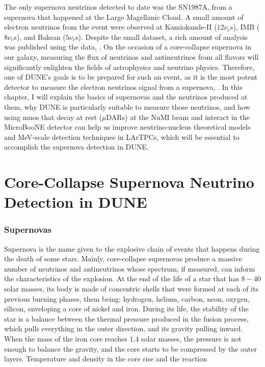 The only supernova neutrinos detected to date was the SN1987A, from a supernova that happened at the Large Magellanic Cloud. A small amount of electron neutrinos from the event were observed at Kamiokande-II ($12 \nu_e$s), IMB ($8 \nu_e$s), and Baksan ($5 \nu_e$s). Despite the small dataset, a rich amount of analysis was published using the data, \cite{Kamiokande-II-PRL, Kamiokande-II-PRD, IMB, Baksan}. 
 On the occasion of a core-collapse supernova in our galaxy, measuring the flux of neutrinos and antineutrinos from all flavors will significantly enlighten the fields of astrophysics and neutrino physics. Therefore, one of DUNE's goals is to be prepared for such an event, as it is the most potent detector to measure the electron neutrinos signal from a supernova, \cite{dune_SAND}.
 In this chapter, I will explain the basics of supernovas and the neutrinos produced at them, why DUNE is particularly suitable to measure those neutrinos, and how using muos that decay at rest ($\mu$DARs) at the NuMI beam and interact in the MicroBooNE detector can help us improve neutrino-nucleus theoretical models and MeV-scale detection techniques in LArTPCs, which will be essential to accomplish the supernova detection in DUNE. 

\section{Core-Collapse Supernova Neutrino Detection in DUNE}
\subsubsection{Supernovas}
Supernova is the name given to the explosive chain of events that happens during the death of some stars. Mainly, core-collapse supernovas produce a massive number of neutrinos and antineutrinos whose spectrum, if measured, can inform the characteristics of the explosion. 
At the end of the life of a star that has $8-40$ solar masses, its body is made of concentric shells that were formed at each of its previous burning phases, them being: hydrogen, helium, carbon, neon, oxygen, silicon, enveloping a core of nickel and iron. During its life, the stability of the star is a balance between the thermal pressure produced in the fusion process, which pulls everything in the outer direction, and its gravity pulling inward. When the mass of the iron core reaches $1.4$ solar masses, the pressure is not enough to balance the gravity, and the core starts to be compressed by the outer layers. Temperature and density in the core rise and the reaction

